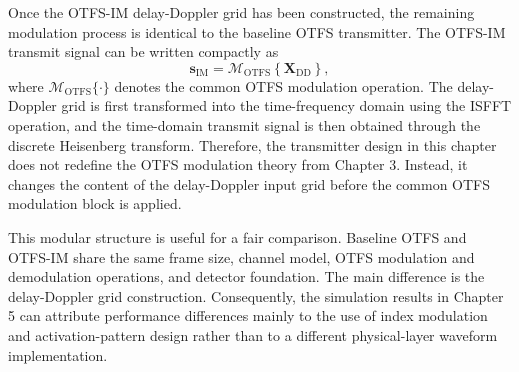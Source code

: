 Once the OTFS-IM delay-Doppler grid has been constructed, the remaining modulation process is identical to the baseline OTFS transmitter. The OTFS-IM transmit signal can be written compactly as
\begin{equation}
    \mathbf{s}_{\mathrm{IM}}
    =
    \mathcal{M}_{\mathrm{OTFS}}
    \left\{
    \mathbf{X}_{\mathrm{DD}}
    \right\},
    \label{eq:otfs_im_common_modulation}
\end{equation}
where \(\mathcal{M}_{\mathrm{OTFS}}\{\cdot\}\) denotes the common OTFS modulation operation. The delay-Doppler grid is first transformed into the time-frequency domain using the ISFFT operation, and the time-domain transmit signal is then obtained through the discrete Heisenberg transform. Therefore, the transmitter design in this chapter does not redefine the OTFS modulation theory from Chapter 3. Instead, it changes the content of the delay-Doppler input grid before the common OTFS modulation block is applied.

This modular structure is useful for a fair comparison. Baseline OTFS and OTFS-IM share the same frame size, channel model, OTFS modulation and demodulation operations, and detector foundation. The main difference is the delay-Doppler grid construction. Consequently, the simulation results in Chapter 5 can attribute performance differences mainly to the use of index modulation and activation-pattern design rather than to a different physical-layer waveform implementation.
